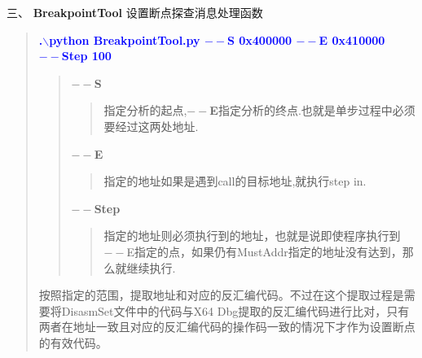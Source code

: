 \documentclass[AutoFakeBold,AutoFakeSlant]{article}
\begin{document}
	\newpage
	
	\begin{flushleft}
		\begin{LARGE}
			三、 \textbf{BreakpointTool} 设置断点探查消息处理函数
		\end{LARGE}
		
		\large 
		\linespread{1.6} \selectfont
		
		\begin{quote}
			\textcolor{blue}{ \textbf{ \Large
					.$\backslash$python BreakpointTool.py $--$S 0x400000 $--$E 0x410000 \\$--$Step 100 }}
			\begin{quote}
				\textbf{$--$S}
				\begin{quote} 指定分析的起点,\textbf{$--$E}指定分析的终点.也就是单步过程中必须要经过这两处地址.
				\end{quote}
				\textbf{$--$E} 
				\begin{quote}
					指定的地址如果是遇到call的目标地址,就执行step in.
				\end{quote}
				\textbf{$--$Step}
				\begin{quote}
					指定的地址则必须执行到的地址，也就是说即使程序执行到$--$E指定的点，如果仍有MustAddr指定的地址没有达到，那么就继续执行.
				\end{quote}
			\end{quote}
			
			\bigskip
			
			按照指定的范围，提取地址和对应的反汇编代码。不过在这个提取过程是需要将DisasmSet文件中的代码与X64 Dbg提取的反汇编代码进行比对，只有两者在地址一致且对应的反汇编代码的操作码一致的情况下才作为设置断点的有效代码。
			
		\end{quote}
		
	\end{flushleft}
	
	\newpage
	
\end{document}
